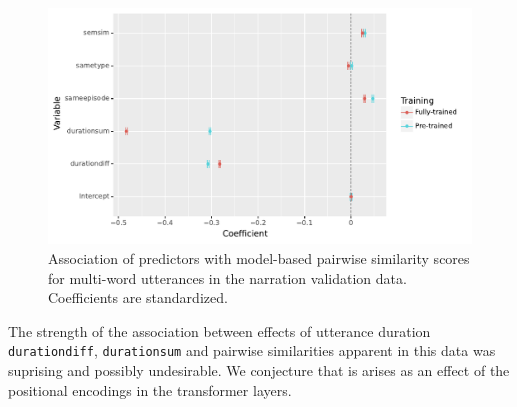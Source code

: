 \begin{figure}
  \centering
  \includegraphics[scale=0.66]{results/grsa_narration_multiword_coef.pdf}
  \caption{Association of predictors with 
    model-based pairwise similarity scores for multi-word utterances
    in the narration validation data. Coefficients are standardized.}
  \label{fig:coef_multiword_narration}
\end{figure}




The strength of the association between effects of utterance
duration {\tt durationdiff}, {\tt durationsum} and pairwise similarities apparent in this
data was suprising and possibly undesirable. We conjecture that is
arises as an effect of the positional encodings in the transformer
layers.

